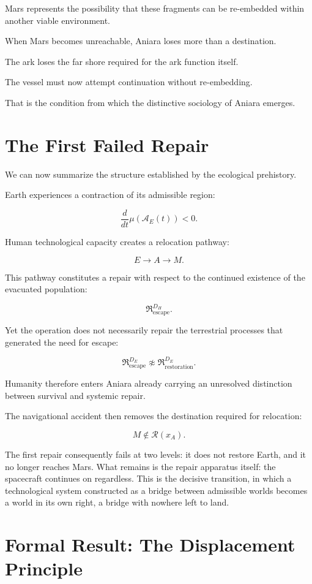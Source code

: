 \documentclass[11pt,oneside]{book}
\theoremstyle{definition}
\theoremstyle{remark}
\newcommand{\A}{\mathcal{A}}
\newcommand{\R}{\mathcal{R}}
\newcommand{\Repair}{\mathfrak{R}}
\begin{document}
Mars represents the possibility that these fragments can be re-embedded within another viable environment.

When Mars becomes unreachable, Aniara loses more than a destination.

The ark loses the far shore required for the ark function itself.

The vessel must now attempt continuation without re-embedding.

That is the condition from which the distinctive sociology of Aniara emerges.

\section{The First Failed Repair}

We can now summarize the structure established by the ecological prehistory.

Earth experiences a contraction of its admissible region:

\[
\frac{d}{dt}\mu(\A_E(t))<0.
\]

Human technological capacity creates a relocation pathway:

\[
E
\rightarrow
A
\rightarrow
M.
\]

This pathway constitutes a repair with respect to the continued existence of the evacuated population:

\[
\Repair^{D_H}_{\mathrm{escape}}.
\]

Yet the operation does not necessarily repair the terrestrial processes that generated the need for escape:

\[
\Repair^{D_E}_{\mathrm{escape}}
\not\approx
\Repair^{D_E}_{\mathrm{restoration}}.
\]

Humanity therefore enters Aniara already carrying an unresolved distinction between survival and systemic repair.

The navigational accident then removes the destination required for relocation:

\[
M\notin\R(x_A).
\]

The first repair consequently fails at two levels: it does not restore Earth, and it no longer reaches Mars. What remains is the repair apparatus itself: the spacecraft continues on regardless. This is the decisive transition, in which a technological system constructed as a bridge between admissible worlds becomes a world in its own right, a bridge with nowhere left to land.

\section{Formal Result: The Displacement Principle}
\end{document}
